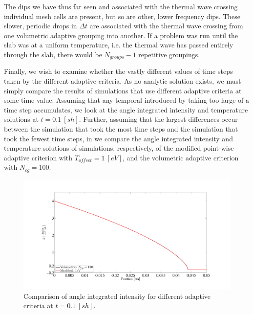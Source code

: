 The dips we have thus far seen and associated with the thermal wave crossing individual mesh cells are present, but so are other, lower frequency dips.
These slower, periodic drops in $\Delta t$ are associated with the thermal wave crossing from one volumetric adaptive grouping into another.  
If a problem was run until the slab was at a uniform temperature, i.e. the thermal wave has passed entirely through the slab, there would be $N_{groups}-1$ repetitive groupings.

Finally, we wish to examine whether the vastly different values of time steps taken by the different adaptive criteria.
As no analytic solution exists, we must simply compare the results of simulations that use different adaptive criteria at some time value.
Assuming that any temporal introduced by taking too large of a time step accumulates, we look at the angle integrated intensity and temperature solutions at $t=0.1~[sh]$.
Further, assuming that the largest differences occur between the simulation that took the most time steps and the simulation that took the fewest time steps, in  we compare the angle integrated intensity and temperature solutions of simulations, respectively, of the modified point-wise adaptive criterion with $T_{offset} = 1~[eV]$, and the volumetric adaptive criterion with $N_{cg}=100$.
\begin{figure}[!htp]
\centering
\includegraphics[width=16cm,trim=2in  0.4in 0.5in 0.75in,clip=true]{chapter6_grey_radtran/Dissertation_Data/100C_Physical_Marshak_Wave_Radiation_Adaptive_Comparison_Final_1eV.pdf}
\caption{Comparison of angle integrated intensity for different adaptive criteria at $t=0.1~[sh]$.}
\label{fig:time_difference_radiation}
\end{figure}
